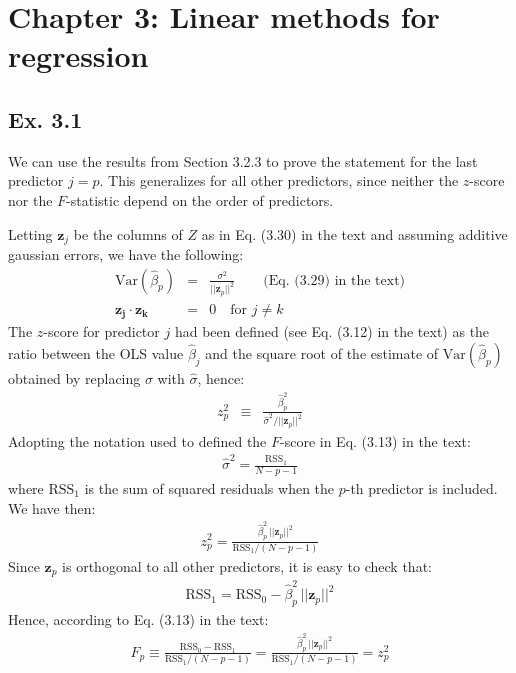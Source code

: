 
\section*{Chapter 3: Linear methods for regression}

\subsection*{Ex. 3.1}
We can use the results from Section 3.2.3 to prove the statement for the last predictor $j = p$. This generalizes for all other predictors, since neither the $z$-score nor the $F$-statistic depend on the order of predictors.

Letting $ \mathbf{z}_j$ be the columns of $Z$ as in Eq. (3.30) in the text and assuming additive gaussian errors, 
we have the following:
\begin{eqnarray*}
\textrm{Var}(\hat{\beta}_p) & = & \frac{\sigma^2}{|| \mathbf{z}_p||^2} \qquad \textrm{(Eq. (3.29) in the text)}\\
\mathbf{z_j} \cdot \mathbf{z_k} & = & 0 \quad \textrm{for } j \neq k
\end{eqnarray*}
The $z$-score for predictor $j$ had been defined (see Eq. (3.12) in the text) as the ratio between the OLS value $\hat{\beta}_j$
and the square root of the estimate of $\textrm{Var}(\hat{\beta}_p)$ obtained by replacing $\sigma$ with $\hat{\sigma}$, hence:
\begin{eqnarray*}
z_p^2 & \equiv & \frac{\hat{\beta}_p^2}{\hat{\sigma}^2 / || \mathbf{z}_p||^2}
\end{eqnarray*}
Adopting the notation used to defined the $F$-score in Eq. (3.13) in the text:
\begin{eqnarray*}
\hat{\sigma}^2 = \frac{\textrm{RSS}_1}{N - p - 1}
\end{eqnarray*}
where $\textrm{RSS}_1$ is the sum of squared residuals when the $p$-th predictor is included. We have then:
\begin{eqnarray*}
z_p^2 = \frac{\hat{\beta}_p ^2\,|| \mathbf{z}_p||^2}{\textrm{RSS}_1 / (N - p - 1)}
\end{eqnarray*}
Since $\mathbf{z}_p$ is orthogonal to all other predictors, it is easy to check that:
\begin{eqnarray*}
\textrm{RSS}_1 = \textrm{RSS}_0 - \hat{\beta}_p^2 \, || \mathbf{z}_p ||^2
\end{eqnarray*}
Hence, according to Eq. (3.13) in the text:
\begin{eqnarray*}
F_{p} \equiv \frac{\textrm{RSS}_0 - \textrm{RSS}_1}{\textrm{RSS}_1 / (N - p - 1)} = \frac{\hat{\beta}_p^2 \, || \mathbf{z}_p ||^2}{\textrm{RSS}_1 / (N - p - 1)} = z_p^2
\end{eqnarray*}

